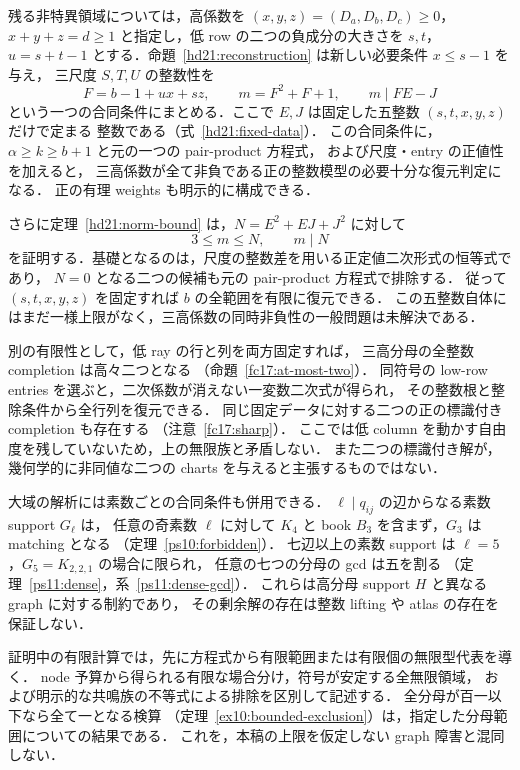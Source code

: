 残る非特異領域については，高係数を
$(x,y,z)=(D_a,D_b,D_c)\ge0$，$x+y+z=d\ge1$ と指定し，低 row の二つの負成分の大きさを $s,t$，
$u=s+t-1$ とする．命題~\ref{hd21:reconstruction} は新しい必要条件 $x\le s-1$ を与え，
三尺度 $S,T,U$ の整数性を
\[
 F=b-1+ux+sz,\qquad m=F^2+F+1,\qquad m\mid FE-J
\]
という一つの合同条件にまとめる．ここで $E,J$ は固定した五整数 $(s,t,x,y,z)$ だけで定まる
整数である（式~\eqref{hd21:fixed-data}）．
この合同条件に，$\alpha\ge k\ge b+1$ と元の一つの pair-product 方程式，
および尺度・entry の正値性を加えると，
三高係数が全て非負である正の整数模型の必要十分な復元判定になる．
正の有理 weights も明示的に構成できる．

さらに定理~\ref{hd21:norm-bound} は，$N=E^2+EJ+J^2$ に対して
\[
 3\le m\le N,\qquad m\mid N
\]
を証明する．基礎となるのは，尺度の整数差を用いる正定値二次形式の恒等式であり，
$N=0$ となる二つの候補も元の pair-product 方程式で排除する．
従って $(s,t,x,y,z)$ を固定すれば $b$ の全範囲を有限に復元できる．
この五整数自体にはまだ一様上限がなく，三高係数の同時非負性の一般問題は未解決である．

別の有限性として，低 ray の行と列を両方固定すれば，
三高分母の全整数 completion は高々二つとなる
（命題~\ref{fc17:at-most-two}）．
同符号の low-row entries を選ぶと，二次係数が消えない一変数二次式が得られ，
その整数根と整除条件から全行列を復元できる．
同じ固定データに対する二つの正の標識付き completion も存在する
（注意~\ref{fc17:sharp}）．
ここでは低 column を動かす自由度を残していないため，上の無限族と矛盾しない．
また二つの標識付き解が，幾何学的に非同値な二つの charts を与えると主張するものではない．

大域の解析には素数ごとの合同条件も併用できる．
$\ell\mid q_{ij}$ の辺からなる素数 support $G_\ell$ は，
任意の奇素数 $\ell$ に対して $K_4$ と book $B_3$ を含まず，$G_3$ は matching となる
（定理~\ref{ps10:forbidden}）．
七辺以上の素数 support は $\ell=5$，$G_5=K_{2,2,1}$ の場合に限られ，
任意の七つの分母の gcd は五を割る
（定理~\ref{ps11:dense}，系~\ref{ps11:dense-gcd}）．
これらは高分母 support $H$ と異なる graph に対する制約であり，
その剰余解の存在は整数 lifting や atlas の存在を保証しない．

証明中の有限計算では，先に方程式から有限範囲または有限個の無限型代表を導く．
node 予算から得られる有限な場合分け，符号が安定する全無限領域，
および明示的な共鳴族の不等式による排除を区別して記述する．
全分母が百一以下なら全て一となる検算
（定理~\ref{ex10:bounded-exclusion}）は，指定した分母範囲についての結果である．
これを，本稿の上限を仮定しない graph 障害と混同しない．


